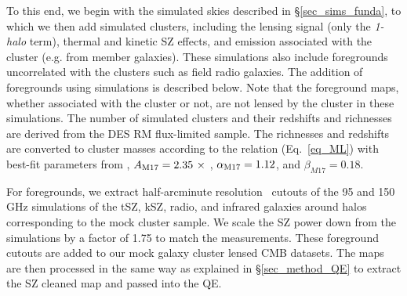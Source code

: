 To this end, we begin with the simulated skies described in \S\ref{sec_sims_funda}, to which we then add simulated clusters, including the lensing signal (only the {\it 1-halo} term), thermal and kinetic SZ effects, and emission associated with the cluster (e.g. from member galaxies). %
These simulations also include foregrounds uncorrelated with the clusters such as field radio galaxies.
The addition of foregrounds using \cite{sehgal10} simulations is described below. 
Note that the foreground maps, whether associated with the cluster or not, are not lensed by the cluster in these simulations. 
The number of simulated clusters and their redshifts and richnesses are derived from the  DES RM \whichyear{} flux-limited sample. 
The richnesses and redshifts are converted to cluster masses according to the \ML{} relation (Eq.~\ref{eq_ML}) with best-fit parameters from \citet{melchoir17}, $A_{\rm M17} = 2.35\ \times$ \munits, $\alpha_{\rm M17} = 1.12$, and $\beta_{M17} = 0.18$.  

For foregrounds, we extract half-arcminute resolution \boxsize\ cutouts of the 95 and 150 GHz \cite{sehgal10} simulations of the tSZ, kSZ, radio, and infrared galaxies around halos corresponding to the mock cluster sample. %
We scale the SZ power down from the \cite{sehgal10} simulations by a factor of 1.75 to match the \citet{george15} measurements.
These foreground cutouts are added to our mock galaxy cluster lensed CMB datasets. %
The maps are then processed in the same way as explained in \S\ref{sec_method_QE} to extract the SZ cleaned map and passed into the QE. 


